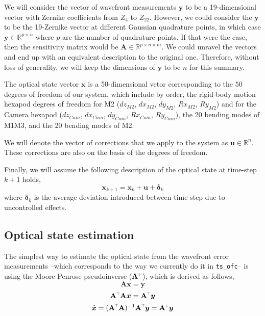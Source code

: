 \documentclass[SE,authoryear,toc]{lsstdoc}
\renewcommand{\v}[1]{\mathbf{#1}}
\newcommand{\plus}{\scalebox{0.6}{$+$}}
\newcommand{\tr}{\scalebox{0.6}{$\top$}}
\begin{document}
We will consider the vector of wavefront measurements $\bm{y}$ to be a 19-dimensional vector with Zernike coefficients from $Z_4$ to $Z_{22}$. However, we could consider the $\bm{y}$ to be the 19-Zernike vector at different Gaussian quadrature points, in which case $\bm{y} \in \mathbb{R}^{p \times n}$ where $p$ are the number of quadrature points. If that were the case, then the sensitivity matrix would be $\v{A} \in \mathbb{R}^{p \times n \times m}$. We could unravel the vectors and end up with an equivalent description to the original one. Therefore, without loss of generality, we will keep the dimensions of $\bm{y}$ to be $n$ for this summary.

The optical state vector  $\bm{x}$ is a 50-dimensional vetor corresponding to the $50$ degrees of freedom of our system, which include by order, the rigid-body motion hexapod degrees of freedom for M2 ($dz_{M2}$, $dx_{M2}$, $dy_{M2}$, $Rx_{M2}$, $Ry_{M2}$) and for the Camera hexapod ($dz_{Cam}$, $dx_{Cam}$, $dy_{Cam}$, $Rx_{Cam}$, $Ry_{Cam}$), the 20 bending modes of M1M3, and the 20 bending modes of M2. 

We will denote the vector of corrections that we apply to the system as $\bm{u} \in \mathbb{R}^n$. These corrections are also on the basis of the degrees of freedom.

Finally, we will assume the following description of the optical state at time-step $k + 1$ holds, 
\begin{equation}\label{eq3}
    \bm{x}_{k + 1} = \bm{x}_{k} + \bm{u} + \bm{\delta}_{k}
\end{equation}
where $\bm{\delta}_{k}$ is the average deviation introduced between time-step due to uncontrolled effects.

\subsection*{Optical state estimation}
The simplest way to estimate the optical state from the wavefront error measurements --which corresponds to the way we currently do it in \texttt{ts\_ofc}-- is using the Moore-Penrose pseudoinverse ($\v{A}^{\plus}$), which is derived as follows,
\begin{equation*}
     \v{A}\bm{x} = \bm{y}
\end{equation*}
\begin{equation*}
     \v{A}^{\tr}\v{A}\bm{x} = \v{A}^{\tr}\bm{y}
\end{equation*}
\begin{equation*}
    \hat{\bm{x}} = (\v{A}^{\tr} \v{A})^{-1}\v{A}^{\tr}\bm{y} = \v{A}^{\plus}\bm{y}
\end{equation*}
\end{document}

